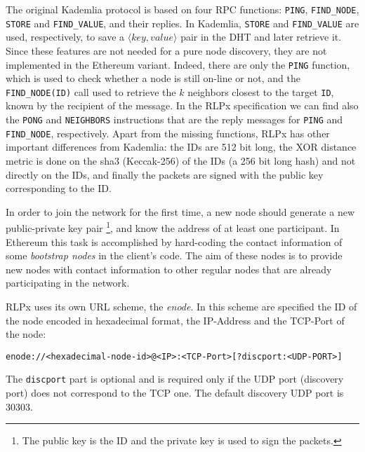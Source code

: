 The original Kademlia protocol is based on four RPC functions: \verb|PING|,
\verb|FIND_NODE|, \verb|STORE| and \verb|FIND_VALUE|, and their replies. In
Kademlia, \verb|STORE| and \verb|FIND_VALUE| are used, respectively, to save a
$\langle key, value\rangle$ pair in the DHT and later retrieve it. Since these
features are not needed for a pure node discovery, they are not implemented in
the Ethereum variant. Indeed, there are only the \verb|PING| function, which is
used to check whether a node is still on-line or not, and the
\verb|FIND_NODE(ID)| call used to retrieve the $k$ neighbors closest to the
target \verb|ID|, known by the recipient of the message. In the RLPx
specification we can find also the \verb|PONG| and \verb|NEIGHBORS| instructions
that are the reply messages for \verb|PING| and \verb|FIND_NODE|, respectively.
Apart from the missing functions, RLPx has other important differences from
Kademlia: the IDs are 512 bit long, the XOR distance metric is done on the
sha3 (Keccak-256) of the IDs (a 256 bit long hash) and not directly on the
IDs, and finally the packets are signed with the public key corresponding to the
ID.

In order to join the network for the first time, a new node should generate a
new public-private key pair \footnote{The public key is the ID and the private
key is used to sign the packets.}, and know the address of at least one
participant. In Ethereum this task is accomplished by hard-coding the contact
information of some \textit{bootstrap nodes} in the client's code. The aim of
these nodes is to provide new nodes with contact information to other regular
nodes that are already participating in the network.

RLPx uses its own URL scheme, the \emph{enode}. In this scheme are specified the ID
of the node encoded in hexadecimal format, the IP-Address and the TCP-Port of
the node:
\begin{verbatim}
enode://<hexadecimal-node-id>@<IP>:<TCP-Port>[?discport:<UDP-PORT>]
\end{verbatim}
The \verb|discport| part is optional and is required only if the UDP port
(discovery port) does not correspond to the TCP one. The default discovery UDP
port is 30303.

